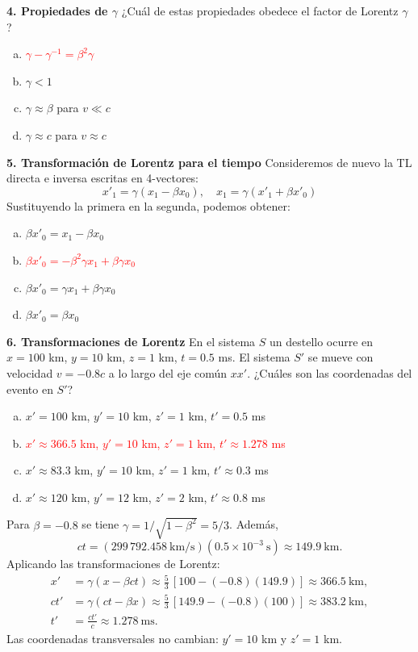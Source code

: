\textbf{4. Propiedades de $\gamma$}
¿Cuál de estas propiedades obedece el factor de Lorentz $\gamma$?
\begin{enumerate}[a)]
    \item \textcolor{red}{$\gamma - \gamma^{-1}= \beta^2\gamma$}
    \item $\gamma< 1$
    \item $\gamma \approx \beta$ para $v \ll c$
    \item $\gamma \approx c$ para $v \approx c$
\end{enumerate}

\textbf{5. Transformación de Lorentz para el tiempo}
Consideremos de nuevo la TL directa e inversa escritas en 4-vectores:
$$x'_1= \gamma(x_1 - \beta x_0), \quad x_1= \gamma(x'_1+ \beta x'_0)$$
Sustituyendo la primera en la segunda, podemos obtener:
\begin{enumerate}[a)]
    \item $\beta x'_0= x_1 - \beta x_0$
    \item \textcolor{red}{$\beta x'_0= -\beta^2\gamma x_1+ \beta\gamma x_0$}
    \item $\beta x'_0= \gamma x_1+ \beta\gamma x_0$
    \item $\beta x'_0= \beta x_0$
\end{enumerate}

\textbf{6. Transformaciones de Lorentz}
En el sistema $S$ un destello ocurre en $x= 100$ km, $y= 10$ km, $z= 1$ km, $t= 0.5$ ms. El sistema $S'$ se mueve con velocidad $v= -0.8c$ a lo largo del eje común $xx'$. ¿Cuáles son las coordenadas del evento en $S'$?
\begin{enumerate}[a)]
    \item $x'= 100$ km, $y'= 10$ km, $z'= 1$ km, $t'= 0.5$ ms
    \item \textcolor{red}{$x' \approx 366.5$ km, $y'= 10$ km, $z'= 1$ km, $t' \approx 1.278$ ms}
    \item $x' \approx 83.3$ km, $y'= 10$ km, $z'= 1$ km, $t' \approx 0.3$ ms
    \item $x' \approx 120$ km, $y'= 12$ km, $z'= 2$ km, $t' \approx 0.8$ ms
\end{enumerate}



Para $\beta=-0.8$ se tiene $\gamma=1/\sqrt{1-\beta^2}=5/3$. Además,
\[
ct=(299\,792.458\ \mathrm{km/s})(0.5\times10^{-3}\ \mathrm{s})
\approx149.9\ \mathrm{km}.
\]
Aplicando las transformaciones de Lorentz:
\[
\begin{aligned}
x'&=\gamma(x-\beta ct)
\approx\frac53\,[100-(-0.8)(149.9)]
\approx366.5\ \mathrm{km},\\
ct'&=\gamma(ct-\beta x)
\approx\frac53\,[149.9-(-0.8)(100)]
\approx383.2\ \mathrm{km},\\
t'&=\frac{ct'}{c}\approx1.278\ \mathrm{ms}.
\end{aligned}
\]
Las coordenadas transversales no cambian: $y'=10$ km y $z'=1$ km.

